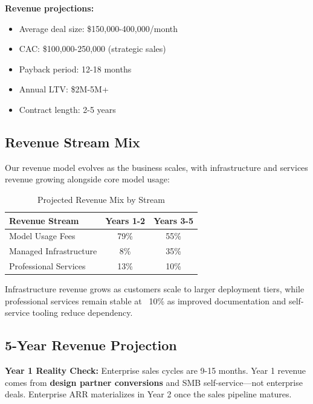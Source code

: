 \textbf{Revenue projections:}
\begin{itemize}[noitemsep]
    \item Average deal size: \$150,000-400,000/month
    \item CAC: \$100,000-250,000 (strategic sales)
    \item Payback period: 12-18 months
    \item Annual LTV: \$2M-5M+
    \item Contract length: 2-5 years
\end{itemize}

\subsection{Revenue Stream Mix}

Our revenue model evolves as the business scales, with infrastructure and services revenue growing alongside core model usage:

\begin{table}[ht]
\centering
\small
\begin{tabular}{|l|c|c|}
\hline
\textbf{Revenue Stream} & \textbf{Years 1-2} & \textbf{Years 3-5} \\
\hline
Model Usage Fees & 79\% & 55\% \\
Managed Infrastructure & 8\% & 35\% \\
Professional Services & 13\% & 10\% \\
\hline
\end{tabular}
\caption{Projected Revenue Mix by Stream}
\end{table}

Infrastructure revenue grows as customers scale to larger deployment tiers, while professional services remain stable at ~10\% as improved documentation and self-service tooling reduce dependency.

\subsection{5-Year Revenue Projection}

\textbf{Year 1 Reality Check:} Enterprise sales cycles are 9-15 months. Year 1 revenue comes from \textbf{design partner conversions} and SMB self-service—not enterprise deals. Enterprise ARR materializes in Year 2 once the sales pipeline matures.

